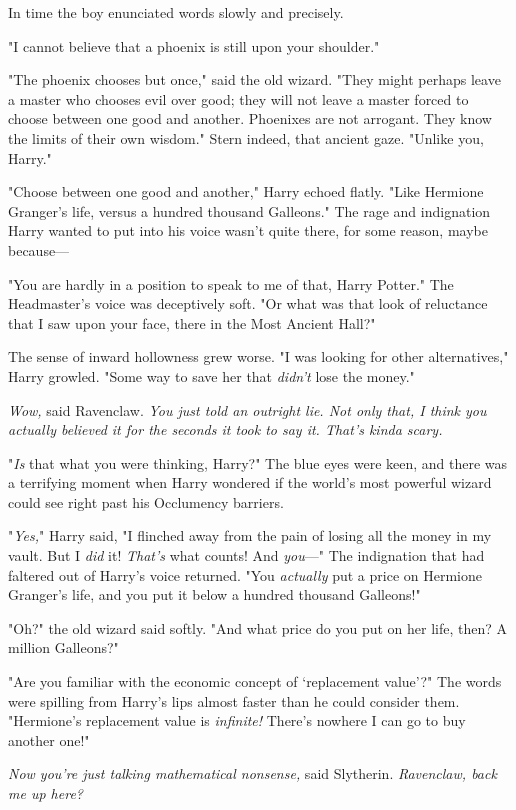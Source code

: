 In time the boy enunciated words slowly and precisely.

"I cannot believe that a phoenix is still upon your shoulder."

"The phoenix chooses but once," said the old wizard. "They might perhaps leave
a master who chooses evil over good; they will not leave a master forced to
choose between one good and another. Phoenixes are not arrogant. They know the
limits of their own wisdom." Stern indeed, that ancient gaze. "Unlike you,
Harry."

"Choose between one good and another," Harry echoed flatly. "Like Hermione
Granger’s life, versus a hundred thousand Galleons." The rage and indignation
Harry wanted to put into his voice wasn’t quite there, for some reason, maybe
because—

"You are hardly in a position to speak to me of that, Harry Potter." The
Headmaster’s voice was deceptively soft. "Or what was that look of reluctance
that I saw upon your face, there in the Most Ancient Hall?"

The sense of inward hollowness grew worse. "I was looking for other
alternatives," Harry growled. "Some way to save her that \emph{didn’t} lose the
money."

\emph{Wow,} said Ravenclaw. \emph{You just told an outright lie. Not only that,
I think you actually \emph{believed} it for the seconds it took to say it.
That’s kinda scary.}

"\emph{Is} that what you were thinking, Harry?" The blue eyes were keen, and
there was a terrifying moment when Harry wondered if the world’s most powerful
wizard could see right past his Occlumency barriers.

"\emph{Yes,}" Harry said, "I flinched away from the pain of losing all the
money in my vault. But I \emph{did} it! \emph{That’s} what counts! And
\emph{you}—" The indignation that had faltered out of Harry’s voice returned.
"You \emph{actually} put a price on Hermione Granger’s life, and you put it
below a hundred thousand Galleons!"

"Oh?" the old wizard said softly. "And what price do you put on her life, then?
A million Galleons?"

"Are you familiar with the economic concept of ‘replacement value’?" The words
were spilling from Harry’s lips almost faster than he could consider them.
"Hermione’s replacement value is \emph{infinite!} There’s nowhere I can go to
buy another one!"

\emph{Now you’re just talking mathematical nonsense,} said Slytherin.
\emph{Ravenclaw, back me up here?}

